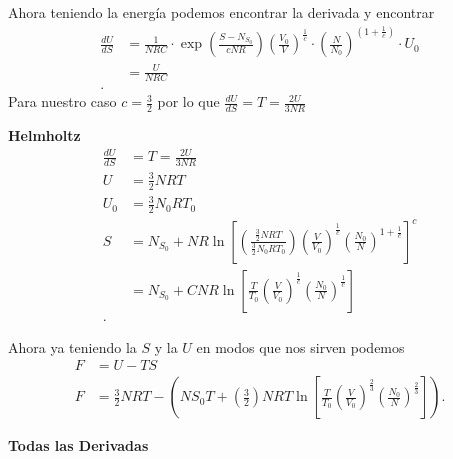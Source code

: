 \documentclass{report}
\begin{document}
Ahora teniendo la energía podemos encontrar la derivada y encontrar
\begin{align*}
  \frac{dU}{dS}&=\frac{1}{NRC}\cdot \exp\left( \frac{S-N_{S_0}}{cNR} \right) \left( \frac{V_0}{V} \right)^{\frac{1}{c}}\cdot\left( \frac{N}{N_0} \right)^{\left( 1+\frac{1}{c} \right) }\cdot U_0\\
  &=  \frac{U}{NRC}\\
.\end{align*}
Para nuestro caso $c=\frac{3}{2}$ por lo que $\frac{dU}{dS}=T=\frac{2U}{3NR}$

\textbf{Helmholtz}
\begin{align*}
  \frac{dU}{dS}&=T=\frac{2U}{3NR}\\
  U&=\frac{3}{2}NRT\\
  U_0&=\frac{3}{2}N_0RT_0\\
  S&= N_{S_0}+NR\ln\left[ \left( \frac{\frac{3}{2}NRT}{\frac{3}{2}N_0RT_0} \right) \left( \frac{V}{V_0} \right)^{\frac{1}{c}}\left( \frac{N_0}{N} \right)^{1+\frac{1}{c}} \right]^c \\
   &= N_{S_0} + CNR\ln\left[ \frac{T}{T_0}\left( \frac{V}{V_0} \right)^{\frac{1}{c}}\left( \frac{N_0}{N} \right)^{\frac{1}{c}} \right]  \\
.\end{align*}

Ahora ya teniendo la $S$ y la $U$ en modos que nos sirven podemos
\begin{align*}
  F&= U-TS \\
  F&= \frac{3}{2}NRT-\left( NS_0T+\left( \frac{3}{2} \right) NRT\ln\left[ \frac{T}{T_0}\left( \frac{V}{V_0} \right)^{\frac{2}{3}}\left( \frac{N_0}{N} \right)^{\frac{2}{3}} \right]  \right) 
.\end{align*}

\textbf{Todas las Derivadas}
\end{document}
